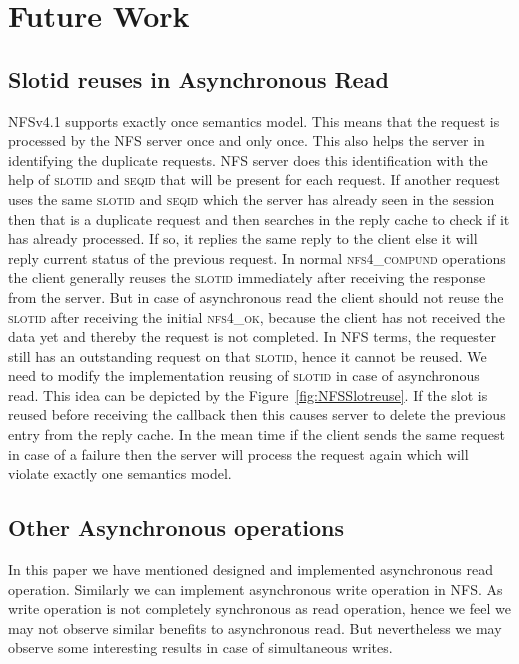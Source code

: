 \section{Future Work}
\subsection{Slotid reuses in Asynchronous Read}

	NFSv4.1 supports exactly once semantics model. This means that the request is processed by the NFS server once and only once. This also helps the server in identifying the duplicate requests. NFS server does this identification with the help of \textsc{slotid} and \textsc{seqid} that will be present for each request. If another request uses the same \textsc{slotid} and \textsc{seqid} which the server has already seen in the session then that is a duplicate request and then searches in the reply cache to check if it has already processed. If so, it replies the same reply to the client else it will reply current status of the previous request. In normal \textsc{nfs4\_compund} operations the client generally reuses the \textsc{slotid} immediately after receiving the response from the server. But in case of asynchronous read the client should not reuse the \textsc{slotid} after receiving the initial \textsc{nfs4\_ok}, because the client has not received the data yet and thereby the request is not completed. In NFS terms, the requester still has an outstanding request on that \textsc{slotid}, hence it cannot be reused. We need to modify the implementation reusing of \textsc{slotid} in case of asynchronous read. This idea can be depicted by the Figure~\ref{fig:NFSSlotreuse}. If the slot is reused before receiving the callback then this causes server to delete the previous entry from the reply cache. In the mean time if the client sends the same request in case of a failure then the server will process the request again which will violate exactly one semantics model.
	
\subsection{Other Asynchronous operations}

	In this paper we have mentioned designed and implemented asynchronous read operation. Similarly we can implement asynchronous write operation in NFS. As write operation is not completely synchronous as read operation, hence we feel we may not observe similar benefits to asynchronous read. But nevertheless we may observe some interesting results in case of simultaneous writes. 
	
